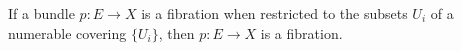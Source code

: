 If a bundle $p \colon E \to X$ is a fibration when restricted to the subsets $U_i$ of a numerable covering $\{U_i\}$, then $p \colon E \to X$ is a fibration.
